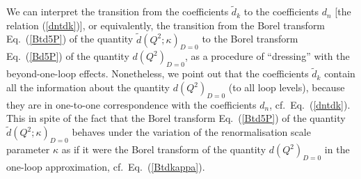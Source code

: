 \documentclass[aps,nofootinbib,showkeys,noshowpacs,preprintnumbers,amsmath,amssymb]{revtex4}
\newcommand{\td}{{\widetilde d}}
\begin{document}
We can interpret the transition from the coefficients $\td_k$ to the coefficients $d_n$ [the relation (\ref{dntdk})], or equivalently, the transition from the Borel transform Eq.~(\ref{Btd5P}) of the quantity $\td(Q^2;\kappa)_{D=0}$ to the Borel transform Eq.~(\ref{Bd5P}) of the quantity $d(Q^2)_{D=0}$, as a procedure of ``dressing'' with the beyond-one-loop effects. Nonetheless, we point out that the coefficients $\td_k$ contain all the information about the quantity $d(Q^2)_{D=0}$ (to all loop levels), because they are in one-to-one correspondence with the coefficients $d_n$, cf.~Eq.~(\ref{dntdk}). This in spite of the fact that the Borel transform Eq.~(\ref{Btd5P}) of the quantity $\td(Q^2;\kappa)_{D=0}$ behaves under the variation of the renormalisation scale parameter $\kappa$ as if it were the Borel transform of the  quantity $d(Q^2)_{D=0}$ in the one-loop approximation, cf.~Eq.~(\ref{Btdkappa}).
\end{document}
